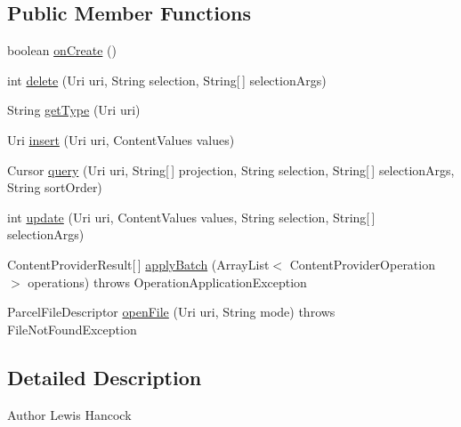 \subsection*{Public Member Functions}
\begin{DoxyCompactItemize}
\item 
boolean \hyperlink{classuk_1_1ac_1_1swan_1_1digitaltrails_1_1database_1_1_white_rock_content_provider_acd2f75ed715d567cdfd10a85f1d5cde4}{on\+Create} ()
\item 
int \hyperlink{classuk_1_1ac_1_1swan_1_1digitaltrails_1_1database_1_1_white_rock_content_provider_ada4e83c84f3ff3c81306424f411ee717}{delete} (Uri uri, String selection, String\mbox{[}$\,$\mbox{]} selection\+Args)
\item 
String \hyperlink{classuk_1_1ac_1_1swan_1_1digitaltrails_1_1database_1_1_white_rock_content_provider_ac7cd4beaf0b759ae3cf75d053ab8994d}{get\+Type} (Uri uri)
\item 
Uri \hyperlink{classuk_1_1ac_1_1swan_1_1digitaltrails_1_1database_1_1_white_rock_content_provider_abd025abd5279cb2b52f5bdd0aec026cb}{insert} (Uri uri, Content\+Values values)
\item 
Cursor \hyperlink{classuk_1_1ac_1_1swan_1_1digitaltrails_1_1database_1_1_white_rock_content_provider_ae88373574109e457a29ffd6f0bca6be2}{query} (Uri uri, String\mbox{[}$\,$\mbox{]} projection, String selection, String\mbox{[}$\,$\mbox{]} selection\+Args, String sort\+Order)
\item 
int \hyperlink{classuk_1_1ac_1_1swan_1_1digitaltrails_1_1database_1_1_white_rock_content_provider_a27b0a0434512cc107c55c205b244c086}{update} (Uri uri, Content\+Values values, String selection, String\mbox{[}$\,$\mbox{]} selection\+Args)
\item 
Content\+Provider\+Result\mbox{[}$\,$\mbox{]} \hyperlink{classuk_1_1ac_1_1swan_1_1digitaltrails_1_1database_1_1_white_rock_content_provider_ab573bd8caeb367dde2e4c95a6214ae1e}{apply\+Batch} (Array\+List$<$ Content\+Provider\+Operation $>$ operations)  throws Operation\+Application\+Exception 
\item 
Parcel\+File\+Descriptor \hyperlink{classuk_1_1ac_1_1swan_1_1digitaltrails_1_1database_1_1_white_rock_content_provider_aad1175ecf9f106554ff8f7a2f0f5df26}{open\+File} (Uri uri, String mode)  throws File\+Not\+Found\+Exception 
\end{DoxyCompactItemize}


\subsection{Detailed Description}
\begin{DoxyAuthor}{Author}
Lewis Hancock 
\end{DoxyAuthor}


